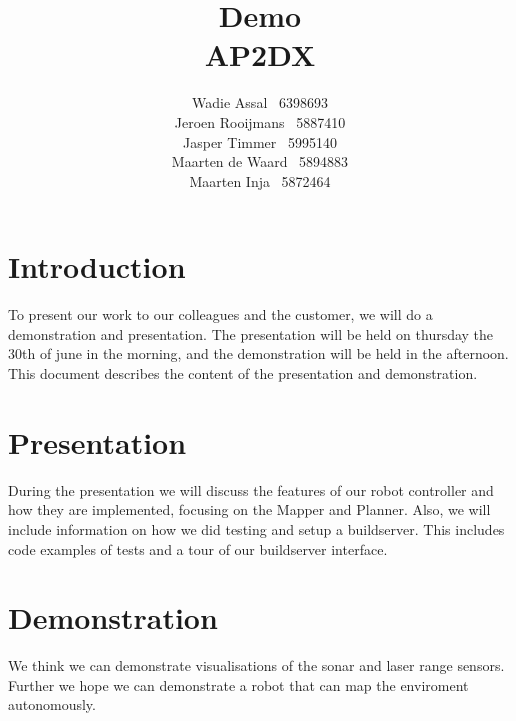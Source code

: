 \documentclass[a4paper,10pt]{article}
\title{Demo\\AP2DX}
\author{Wadie Assal \ 6398693 \\ Jeroen Rooijmans \ 5887410 \\ Jasper Timmer \ 5995140 \\
Maarten de Waard \ 5894883 \\ Maarten Inja \ 5872464}
\begin{document}
\maketitle
\newpage

\section{Introduction}
To present our work to our colleagues and the customer, we will do a demonstration and presentation. The presentation will be held on thursday the 30th of june in the morning, and the demonstration will be held in the afternoon. This document describes the content of the presentation and demonstration.

\section{Presentation}
During the presentation we will discuss the features of our robot controller and how they are implemented, focusing on the Mapper and Planner. Also, we will include information on how we did testing and setup a buildserver. This includes code examples of tests and a tour of our buildserver interface.

\section{Demonstration}
We think we can demonstrate visualisations of the sonar and laser range sensors. Further we hope we can demonstrate a robot that can map the enviroment autonomously.
\end{document}
